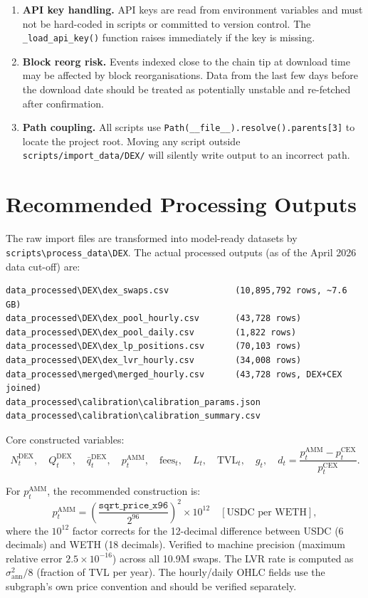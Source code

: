 \documentclass[11pt,a4paper]{article}
\begin{document}
\begin{enumerate}
  \item \textbf{API key handling.} API keys are read from environment
        variables and must not be hard-coded in scripts or committed to
        version control. The \texttt{\_load\_api\_key()} function raises
        immediately if the key is missing.

  \item \textbf{Block reorg risk.} Events indexed close to the chain tip at
        download time may be affected by block reorganisations. Data from
        the last few days before the download date should be treated as
        potentially unstable and re-fetched after confirmation.

  \item \textbf{Path coupling.} All scripts use
        \texttt{Path(\_\_file\_\_).resolve().parents[3]} to locate the
        project root. Moving any script outside
        \texttt{scripts/import\_data/DEX/} will silently write output to an
        incorrect path.
\end{enumerate}

\section{Recommended Processing Outputs}
\label{sec:proc}

The raw import files are transformed into model-ready datasets by
\texttt{scripts\textbackslash process\_data\textbackslash DEX}.
The actual processed outputs (as of the April 2026 data cut-off) are:

\begin{lstlisting}
data_processed\DEX\dex_swaps.csv             (10,895,792 rows, ~7.6 GB)
data_processed\DEX\dex_pool_hourly.csv       (43,728 rows)
data_processed\DEX\dex_pool_daily.csv        (1,822 rows)
data_processed\DEX\dex_lp_positions.csv      (70,103 rows)
data_processed\DEX\dex_lvr_hourly.csv        (34,008 rows)
data_processed\merged\merged_hourly.csv      (43,728 rows, DEX+CEX joined)
data_processed\calibration\calibration_params.json
data_processed\calibration\calibration_summary.csv
\end{lstlisting}

Core constructed variables:
\[
  N_t^{\mathrm{DEX}},\quad
  Q_t^{\mathrm{DEX}},\quad
  \bar{q}_t^{\mathrm{DEX}},\quad
  p_t^{\mathrm{AMM}},\quad
  \mathrm{fees}_t,\quad
  L_t,\quad
  \mathrm{TVL}_t,\quad
  g_t,\quad
  d_t = \frac{p_t^{\mathrm{AMM}} - p_t^{\mathrm{CEX}}}{p_t^{\mathrm{CEX}}}.
\]

For $p_t^{\mathrm{AMM}}$, the recommended construction is:
\[
  p_t^{\mathrm{AMM}} = \left(\frac{\texttt{sqrt\_price\_x96}}{2^{96}}\right)^{2}
  \times 10^{12} \quad [\text{USDC per WETH}],
\]
where the $10^{12}$ factor corrects for the 12-decimal difference between
USDC (6 decimals) and WETH (18 decimals). Verified to machine precision
(maximum relative error $2.5 \times 10^{-16}$) across all 10.9M swaps.
The LVR rate is computed as $\sigma^{2}_{\mathrm{ann}}/8$ (fraction of TVL
per year).  The hourly/daily OHLC fields use
the subgraph's own price convention and should be verified separately.
\end{document}
